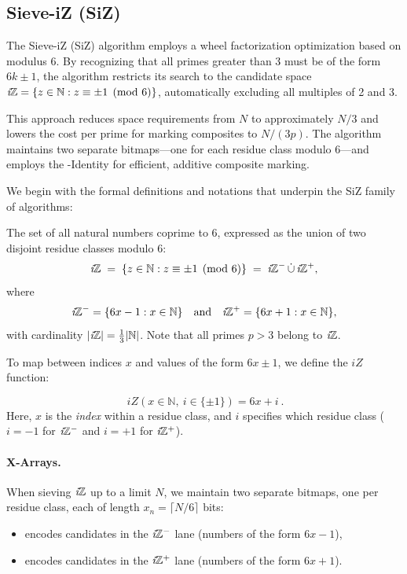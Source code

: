 \documentclass{article}
\begin{document}
\subsection{Sieve-iZ (SiZ)} \label{alg:siz}

The Sieve-iZ (SiZ) algorithm employs a wheel factorization optimization based on modulus 6. By recognizing that all primes greater than 3 must be of the form $6k \pm 1$, the algorithm restricts its search to the candidate space $\textit{i}\mathbb{Z} = \{z \in \mathbb{N} : z \equiv \pm 1 \pmod{6}\}$, automatically excluding all multiples of 2 and 3.

This approach reduces space requirements from $N$ to approximately $N/3$ and lowers the cost per prime for marking composites to $N/(3p)$. The algorithm maintains two separate bitmaps—one for each residue class modulo 6—and employs the \Xp-Identity for efficient, additive composite marking.

We begin with the formal definitions and notations that underpin the SiZ family of algorithms:
\begin{definition}    
    The set of all natural numbers coprime to 6, expressed as the union of two disjoint residue classes modulo 6:
    \[
    \textit{i}\mathbb{Z} \;=\; \{ z\in\mathbb{N} : z\equiv \pm 1 \pmod{6} \} \;=\; \textit{i}\mathbb{Z}^-\,\dot\cup\,\textit{i}\mathbb{Z}^+,
    \]
    where
    \[
    \textit{i}\mathbb{Z}^- = \{6x-1:x\in\mathbb{N}\} \quad\text{and}\quad \textit{i}\mathbb{Z}^+ = \{6x+1:x\in\mathbb{N}\},
    \]
    with cardinality $|\textit{i}\mathbb{Z}| = \frac{1}{3} |\mathbb{N}|$. Note that all primes $p > 3$ belong to $\textit{i}\mathbb{Z}$.
\end{definition}

\noindent
To map between indices $x$ and values of the form $6x\pm1$, we define the $iZ$ function:

\begin{definition}
    \[
    \boxed{\ iZ(x \in\mathbb{N},\ i \in \{\pm 1\})=6x+i\ }.
    \]
    Here, $x$ is the \emph{index} within a residue class, and $i$ specifies which residue class ($i = -1$ for $\textit{i}\mathbb{Z}^-$ and $i = +1$ for $\textit{i}\mathbb{Z}^+$).
\end{definition}

\paragraph{X-Arrays.}
When sieving $\textit{i}\mathbb{Z}$ up to a limit $N$, we maintain two separate bitmaps, one per residue class, each of length $x_n = \lceil N/6 \rceil$ bits:
\begin{itemize}[noitemsep]
    \item {} encodes candidates in the $\textit{i}\mathbb{Z}^-$ lane (numbers of the form $6x-1$),
    \item {} encodes candidates in the $\textit{i}\mathbb{Z}^+$ lane (numbers of the form $6x+1$).
\end{itemize}
\end{document}
